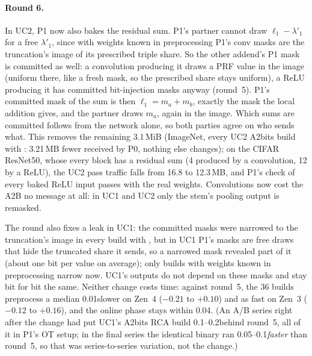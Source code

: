 \paragraph{Round 6.}\label{sec:triadround6} In UC2, P1 now also bakes the residual sum. P1's partner cannot draw
$\ell_1 - \lambda'_1$ for a free $\lambda'_1$, since with weights known in preprocessing P1's conv masks are the
truncation's image of its prescribed triple share. So the other addend's P1 mask is committed as well: a
convolution producing it draws a PRF value in the image (uniform there, like a fresh mask, so the prescribed share
stays uniform), a ReLU producing it has committed bit-injection masks anyway (round~5). P1's committed mask of the sum
is then $\ell_1 = m_a + m_b$, exactly the mask the local addition gives, and the partner draws $m_a$, again in the
image. Which sums are committed follows from the network alone, so both parties agree on who sends what. This removes
the remaining 3.1\,MiB (ImageNet, every UC2 A2bits build with : 3.21\,MB fewer received by P0, nothing
else changes); on the CIFAR ResNet50, whose every block has a residual sum (4 produced by a convolution, 12 by a
ReLU), the UC2 pass traffic falls from 16.8 to 12.3\,MB, and P1's check of every baked ReLU input passes with the real
weights. Convolutions now cost the A2B no message at all: in UC1 and UC2 only the stem's pooling output is remasked.

The round also fixes a leak in UC1: the committed masks were narrowed to the truncation's image in every build with
, but in UC1 P1's masks are free draws that hide the truncated share it sends, so a narrowed mask
revealed part of it (about one bit per value on average); only builds with weights known in preprocessing narrow now.
UC1's outputs do not depend on these masks and stay bit for bit the same. Neither change costs time: against
round~5, the 36 builds preprocess a median 0.01\s slower on Zen~4 ($-0.21$ to $+0.10$\s) and as fast on Zen~3
($-0.12$ to $+0.16$\s), and the online phase stays within 0.04\s. (An A/B series right after the change had put UC1's
A2bits RCA build 0.1--0.2\s behind round~5, all of it in P1's OT setup; in the final series the identical binary ran
0.05--0.1\s \emph{faster} than round~5, so that was series-to-series variation, not the change.)

